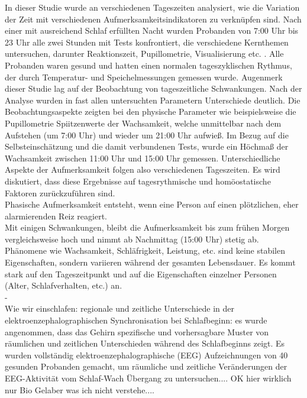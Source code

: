 In dieser Studie wurde an verschiedenen Tageszeiten analysiert, wie die Variation der Zeit mit verschiedenen Aufmerksamkeitsindikatoren zu verknüpfen sind. Nach einer mit ausreichend Schlaf erfüllten Nacht wurden Probanden von 7:00 Uhr bis 23 Uhr alle zwei Stunden mit Tests konfrontiert, die verschiedene Kernthemen untersuchen, darunter Reaktionszeit, Pupillometrie, Visualisierung etc. . Alle Probanden waren gesund und hatten einen normalen tageszyklischen Rythmus, der durch Temperatur- und Speichelmessungen gemessen wurde. Augenmerk dieser Studie lag auf der Beobachtung von tageszeitliche Schwankungen. Nach der Analyse wurden in fast allen untersuchten Parametern Unterschiede deutlich. Die Beobachtungsaspekte zeigten bei den physische Parameter wie beispielsweise die Pupillometrie Spiitzenwerte der Wachsamkeit, welche unmittelbar nach dem Aufstehen (um 7:00 Uhr) und wieder um 21:00 Uhr aufwieß. Im Bezug auf die Selbsteinschätzung und die damit verbundenen Tests, wurde ein Höchmaß der Wachsamkeit zwischen 11:00 Uhr und 15:00 Uhr gemessen. Unterschiedliche Aspekte der Aufmerksamkeit folgen also verschiedenen Tageszeiten. Es wird diskutiert, dass diese Ergebnisse auf tagesrythmische und homöostatische Faktoren zurückzuführen sind.\\
Phasische Aufmerksamkeit entsteht, wenn eine Person auf einen plötzlichen, eher alarmierenden Reiz reagiert.\\
Mit einigen Schwankungen, bleibt die Aufmerksamkeit bis zum frühen Morgen vergleichsweise hoch und nimmt ab Nachmittag (15:00 Uhr) stetig ab.\\
Phänomene wie Wachsamkeit, Schläfrigkeit, Leistung, etc. sind keine stabilen Eigenschaften, sondern variieren während der gesamten Lebensdauer. Es kommt stark auf den Tageszeitpunkt und auf die Eigenschaften einzelner Personen (Alter, Schlafverhalten, etc.) an.\\

-\cite{jewett1999time}\\
Wie wir einschlafen: regionale und zeitliche Unterschiede in der elektroenzephalographischen Synchronisation bei Schlafbeginn:
es wurde angenommen, dass das Gehirn spezifische und vorhersagbare Muster von räumlichen und zeitlichen Unterschieden während des Schlafbeginns zeigt.
Es wurden vollständig elektroenzephalographische (EEG) Aufzeichnungen von 40 gesunden Probanden gemacht, um räumliche und zeitliche Veränderungen der EEG-Aktivität vom Schlaf-Wach Übergang zu untersuchen.... OK hier wirklich nur Bio Gelaber was ich nicht verstehe....
